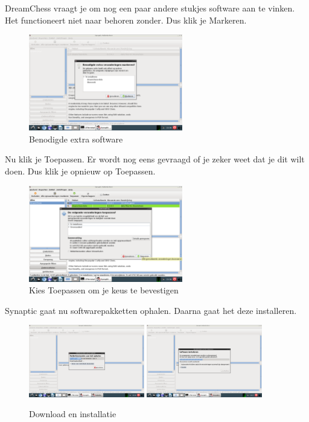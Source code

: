 \documentclass[12pt,a4paper]{article}
\begin{document}
\clearpage

\noindent DreamChess vraagt je om nog een paar andere stukjes software aan te vinken. Het functioneert niet naar behoren zonder. Dus klik je Markeren.

\begin{figure} [H]
\centering
\includegraphics[width=0.6\textwidth]{plaatje08}
\caption{Benodigde extra software}
\label{plaatje08}
\end{figure}

\noindent Nu klik je Toepassen. Er wordt nog eens gevraagd of je zeker weet dat je dit wilt doen. Dus klik je opnieuw op Toepassen. 

\begin{figure} [H]
\centering
\includegraphics[width=0.6\textwidth]{plaatje10}
\caption{Kies Toepassen om je keus te bevestigen}
\label{plaatje10}
\end{figure}

\noindent Synaptic gaat nu softwarepakketten ophalen. Daarna gaat het deze installeren.

\begin{figure} [H]
\centering
\includegraphics[width=0.45\textwidth]{plaatje11}
\includegraphics[width=0.45\textwidth]{plaatje12}
\caption{Download en installatie}
\label{plaatje11}
\end{figure}
\end{document}
